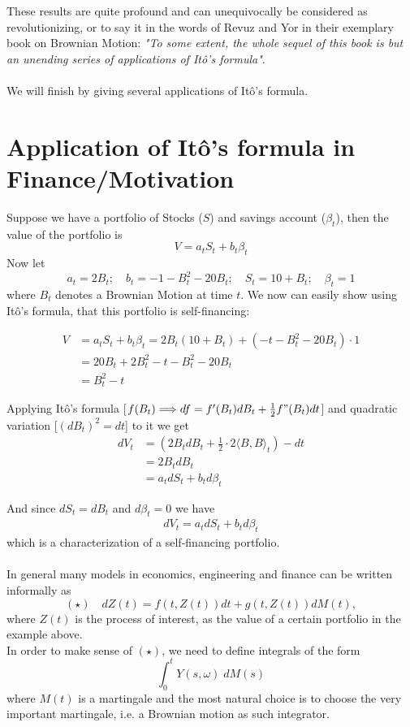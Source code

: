 \documentclass[11pt,a4paper, final]{article}
\theoremstyle{definition}
\begin{document}
\noindent These results are quite profound and can unequivocally be considered as revolutionizing, or to say it in the words of Revuz and Yor in their exemplary book on Brownian Motion: \textit{"To some extent, the whole sequel of this book is but an unending series of applications of Itô's formula"}.
\\\\
We will finish by giving several applications of Itô's formula. 


\section{Application of Itô's formula in Finance/Motivation}
Suppose we have a portfolio of Stocks ($S$) and savings account ($\beta_t$), then the value of the portfolio is
$$ V=a_t S_t + b_t \beta_t $$
Now let $$a_t=2 B_t;\quad b_t=-1-B_t^2-20 B_t;\quad S_t=10+B_t;\quad \beta_t=1$$
where $B_t$ denotes a Brownian Motion at time $t$.
We now can easily show using Itô's formula, that this portfolio is self-financing:

\begin{align*} V&=a_t S_t + b_t \beta_t = 2 B_t(10+B_t) +(-t-B_t^2-20B_t)\cdot 1\\
&=20B_t + 2B_t^2-t-B_t^2-20B_t \\
&=B_t^2-t 
\end{align*}

Applying Itô's formula [$f(B_t) \Longrightarrow df=f'(B_t)dB_t + \frac{1}{2} f"(B_t)dt$] and quadratic variation [$(dB_t)^2=dt$] to it we get
\begin{align*}  dV_t &= (2B_t dB_t + \frac{1}{2}\cdot 2 \langle B, B \rangle_t)-dt\\
&= 2 B_t dB_t\\
&= a_t dS_t + b_t d\beta_t
\end{align*}

And since $dS_t = dB_t$ and $d\beta_t=0$ we have
\begin{align*}dV_t = a_t dS_t + b_t d\beta_t \end{align*}
which is a characterization of a self-financing portfolio.
\\\\
In general many models in economics, engineering and finance can be written informally as
$$ (\star) \quad dZ(t) = f(t, Z(t))dt + g(t,Z(t)) dM(t), $$
where $Z(t)$ is the process of interest, as the value of a certain portfolio in the example above.\\
In order to make sense of $(\star)$, we need to define integrals of the form
$$ \int_0^t Y(s,\omega) \; dM(s)$$
where $M(t)$ is a martingale and the most natural choice is to choose the very important martingale, i.e. a Brownian motion as such integrator.
\end{document}
